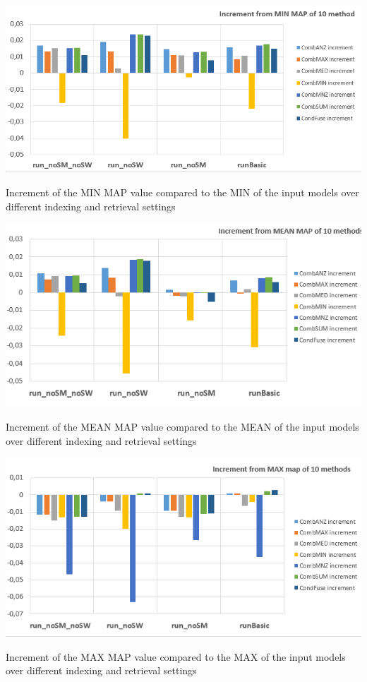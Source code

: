 	\begin{minipage}[H]{0.5\linewidth}
		\centering
		\includegraphics[width=\linewidth]{../eval/results-img-graphs/incrementFromMIN.png}
		\caption{Increment of the MIN MAP value compared to the MIN of the input models over different indexing and retrieval settings}				
		\label{fig:MINincr}
	\end{minipage}
	\begin{minipage}[H]{0.5\linewidth}
		\centering
		\includegraphics[width=\linewidth]{../eval/results-img-graphs/incrementFromMEAN.png}
		\caption{Increment of the MEAN MAP value compared to the MEAN of the input models over different indexing and retrieval settings}				
		\label{fig:MEANincr}
	\end{minipage}
	\begin{minipage}[H]{0.5\linewidth}
		\centering
		\includegraphics[width=\linewidth]{../eval/results-img-graphs/incrementFromMAX.png}
		\caption{Increment of the MAX MAP value compared to the MAX of the input models over different indexing and retrieval settings}				
		\label{fig:MAXincr}
	\end{minipage}

